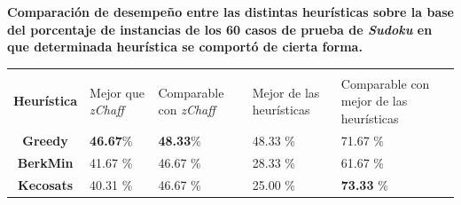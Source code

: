 \documentclass[12pt,lettersize,oneside]{article}
\begin{document}



\begin{center}
  \textbf{Comparación de desempeño entre las distintas heurísticas sobre la base
    del porcentaje de instancias de los 60 casos de prueba de \emph{Sudoku} en
    que determinada heurística se comportó de cierta forma. }
\end{center}
\begin{center}
\begin{tabular}{c|p{2cm}p{2cm}p{2cm}p{2.5cm}}
\hline\\\textbf{Heurística} & Mejor que \emph{zChaff} & Comparable con \emph{zChaff} & Mejor de las heurísticas & Comparable con mejor de las heurísticas \\\hline
\textbf{Greedy}     &   \textbf{46.67}\%          &  \textbf{48.33}\%   &  48.33   \%       & 71.67  \%\\
\textbf{BerkMin}    &   41.67         \% &  46.67                  \% &   28.33    \%     & 61.67 \%\\
\textbf{Kecosats}   &  40.31          \% &  46.67                  \% &    25.00
\%      & \textbf{73.33} \% \\\hline

\end{tabular}
\end{center}
\end{document}
